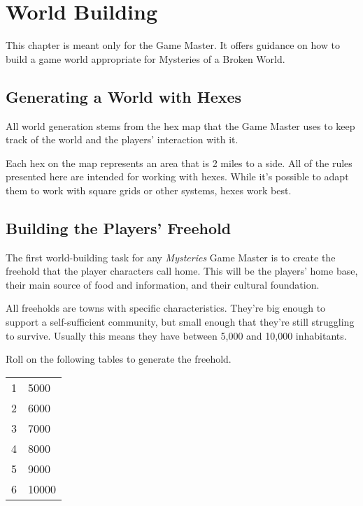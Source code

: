 \chapter{World Building}

\begin{multicols}{2}

This chapter is meant only for the Game Master. It offers
guidance on how to build a game world appropriate for Mysteries
of a Broken World.

\section{Generating a World with Hexes}

All world generation stems from the hex map that the Game Master
uses to keep track of the world and the players' interaction with
it.

Each hex on the map represents an area that is 2 miles to a side.
All of the rules presented here are intended for working with hexes.
While it's possible to adapt them to work with square grids or other
systems, hexes work best.

\section{Building the Players' Freehold}

The first world-building task for any \textit{Mysteries} Game Master is
to create the freehold that the player characters call home. This
will be the players' home base, their main source of food and
information, and their cultural foundation.

All freeholds are towns with specific characteristics. They're big
enough to support a self-sufficient community, but small enough
that they're still struggling to survive. Usually this means they
have between 5,000 and 10,000 inhabitants.

Roll on the following tables to generate the freehold.

\begin{center}
{
\begin{xtabular}{|l|l|}
1 & 5000 \\
2 & 6000 \\
3 & 7000 \\
4 & 8000 \\
5 & 9000 \\
6 & 10000 \\
\hline
\end{xtabular}
}
\end{center}

\end{multicols}
